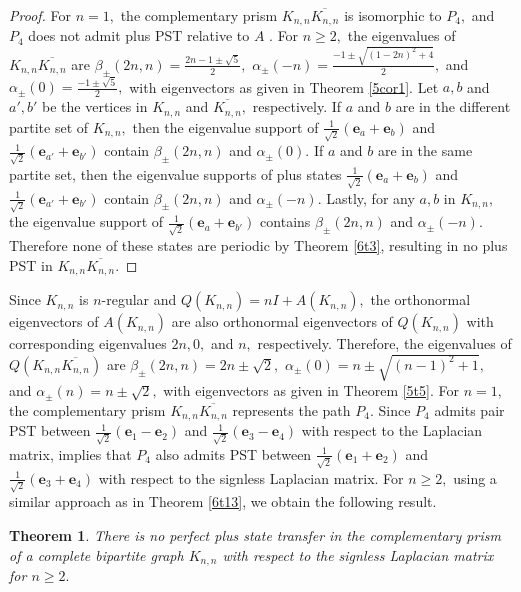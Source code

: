 \documentclass[12pt,a4paper]{article}
\newtheorem{thm}{Theorem}
\def \e {{\bf e}}
\def \e {{\mathbf e}}
\newcommand{\ob}[1]{\left(#1\right)}
\begin{document}
\begin{proof}
For $n=1,$ the complementary prism $K_{n,n}\overline{K_{n,n}}$ is isomorphic to $P_4,$ and $P_4$ does not admit plus PST relative to $A$ \cite[Corollary 7.5]{god7}. For $n\geq 2,$
   the eigenvalues of $K_{n,n}\overline{K_{n,n}}$ are $\beta_{\pm}(2n,n)=\frac{2n-1\pm\sqrt{5}}{2},$ $\alpha_{\pm}(-n)=\frac{-1\pm\sqrt{(1-2n)^2+4}}{2},$ and $\alpha_{\pm}(0)=\frac{-1\pm\sqrt{5}}{2},$ with eigenvectors as given in Theorem \ref{5cor1}. Let $a,b$ and $a',b'$ be the vertices in $K_{n,n}$ and $\overline{K_{n,n}},$ respectively. If $a$ and $b$ are in the different partite set of $K_{n,n},$ then the eigenvalue support of $\frac{1}{\sqrt{2}}\ob{\e_a+\e_b}$ and $\frac{1}{\sqrt{2}}\ob{\e_{a'}+\e_{b'}}$ contain $\beta_{\pm}(2n,n)$ and $\alpha_{\pm}(0).$ If $a$ and $b$ are in the same partite set, then the eigenvalue supports of plus states $\frac{1}{\sqrt{2}}\ob{\e_a+\e_b}$ and $\frac{1}{\sqrt{2}}\ob{\e_{a'}+\e_{b'}}$ contain $\beta_{\pm}(2n,n)$ and $\alpha_{\pm}(-n).$ Lastly, for any $a,b$ in $K_{n,n},$ the eigenvalue support of $\frac{1}{\sqrt{2}}\ob{\e_a+\e_{b'}}$ contains $\beta_{\pm}(2n,n)$ and $\alpha_{\pm}(-n).$ Therefore none of these states are periodic by Theorem \ref{6t3}, resulting in no plus PST in $K_{n,n}\overline{K_{n,n}}.$
\end{proof}
Since $K_{n,n}$ is $n$-regular and $Q(K_{n,n})=nI+A(K_{n,n}),$ the orthonormal eigenvectors of  $A(K_{n,n})$ are also orthonormal eigenvectors of $Q(K_{n,n})$ with corresponding eigenvalues $2n,0,$ and $n,$ respectively. Therefore, the eigenvalues of $Q\ob{K_{n,n}\overline{K_{n,n}}}$ are $\beta_{\pm}(2n,n)=2n\pm\sqrt{2},$ $\alpha_{\pm}(0)=n\pm\sqrt{(n-1)^2+1},$ and $\alpha_{\pm}(n)=n\pm\sqrt{2},$ with eigenvectors as given in Theorem \ref{5t5}. For $n=1,$ the complementary prism $K_{n,n}\overline{K_{n,n}}$ represents the path $P_4.$ Since $P_4$ admits pair PST between $\frac{1}{\sqrt{2}}(\e_1-\e_2)$ and $\frac{1}{\sqrt{2}}(\e_3-\e_4)$ with respect to the Laplacian matrix,  \cite[Theorem 8.3]{che1} implies that $P_4$ also admits PST between $\frac{1}{\sqrt{2}}(\e_1+\e_2)$ and $\frac{1}{\sqrt{2}}(\e_3+\e_4)$ with respect to the signless Laplacian matrix.  For $n\geq 2,$
using a similar approach as in Theorem \ref{6t13}, we obtain the following result.
\begin{thm}
    There is no perfect plus state transfer in the complementary prism of a complete bipartite graph $K_{n,n}$ with respect to the signless Laplacian matrix for $n\geq 2.$ 
\end{thm}
\end{document}
